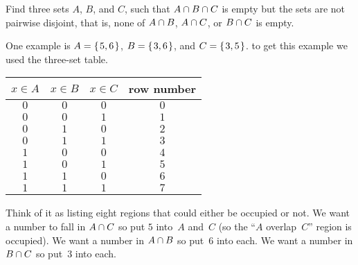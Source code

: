 \documentclass{ibl}  %
\begin{document}
\begin{problem}
  Find three sets $A$, $B$, and $C$, such that 
  $A\cap B\cap C$ is empty but the sets are
  not pairwise disjoint, that is, none of $A\cap B$, 
  $A\cap C$, or $B\cap C$ is empty. 
\begin{answer}
  One example is $A=\mbox{$\{\hspace{0.1em}5,6\hspace{0.1em}\}$}$, $B=\mbox{$\{\hspace{0.1em}3,6\hspace{0.1em}\}$}$, and 
  $C=\mbox{$\{\hspace{0.1em}3,5\hspace{0.1em}\}$}$.
  \remark
  to get this example we used the three-set table.
  \begin{center} \small
    \begin{tabular}{ccc|c}
      $x\in A$  &$x\in B$  &$x\in C$  &row number \\ \hline
         $0$    &$0$       &$0$       &$0$    \\
         $0$    &$0$       &$1$       &$1$    \\
         $0$    &$1$       &$0$       &$2$    \\
         $0$    &$1$       &$1$       &$3$    \\[.5ex]
         $1$    &$0$       &$0$       &$4$    \\
         $1$    &$0$       &$1$       &$5$    \\
         $1$    &$1$       &$0$       &$6$    \\
         $1$    &$1$       &$1$       &$7$    
    \end{tabular}
  \end{center}
  Think of it as listing eight regions that could either be occupied or not.
  We want a number to fall in $A\cap C$ so put
  $5$ into~$A$ and~$C$ (so the ``$A$ overlap~$C$'' region is occupied).
  We want a number in $A\cap B$ so put~$6$ into each.
  We want a number in $B\cap C$ so put~$3$ into each.  
\end{answer}
\end{problem}
\end{document}
